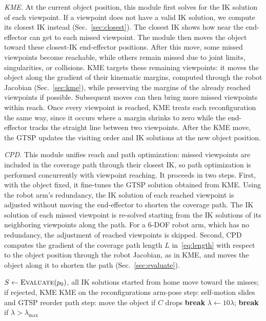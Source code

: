\documentclass[letterpaper, journal, twoside]{IEEEtran}
\begin{document}
\emph{KME.} At the current object position, this module first solves for the IK solution of each viewpoint. If a viewpoint does not have a valid IK solution, we compute its closest IK instead (Sec.~\ref{sec:closest}). The closest IK shows how near the end-effector can get to each missed viewpoint. The module then moves the object toward these closest-IK end-effector positions. After this move, some missed viewpoints become reachable, while others remain missed due to joint limits, singularities, or collisions. KME targets these remaining viewpoints: it moves the object along the gradient of their kinematic margins, computed through the robot Jacobian (Sec.~\ref{sec:kme}), while preserving the margins of the already reached viewpoints if possible. Subsequent moves can then bring more missed viewpoints within reach. Once every viewpoint is reached, KME treats each reconfiguration the same way, since it occurs where a margin shrinks to zero while the end-effector tracks the straight line between two viewpoints. After the KME move, the GTSP updates the visiting order and IK solutions at the new object position.

\emph{CPD.} This module unifies reach and path optimization: missed viewpoints are included in the coverage path through their closest IK, so path optimization is performed concurrently with viewpoint reaching. It proceeds in two steps. First, with the object fixed, it fine-tunes the GTSP solution obtained from KME. Using the robot arm's redundancy, the IK solution of each reached viewpoint is adjusted without moving the end-effector to shorten the coverage path. The IK solution of each missed viewpoint is re-solved starting from the IK solutions of its neighboring viewpoints along the path. For a 6-DOF robot arm, which has no redundancy, the adjustment of reached viewpoints is skipped. Second, CPD computes the gradient of the coverage path length $L$ in~\eqref{eq:length} with respect to the object position through the robot Jacobian, as in KME, and moves the object along it to shorten the path (Sec.~\ref{sec:evaluate}).

\begin{algorithm}[t]
\caption{Object placement and tour co-optimization}
\label{alg:descent}
\begin{algorithmic}[1]
\State $S \gets \textsc{Evaluate}(p_0)$, all IK solutions started from home
    \State move toward the misses; if rejected, KME
    \State KME on the reconfigurations
  \EndIf
  \State arm-pose step: self-motion slides and GTSP reorder
  \State path step: move the object if $C$ drops
     \textbf{break} \EndIf
    \State $\lambda \gets 10\lambda$; \textbf{break} if $\lambda > \lambda_{\max}$
  \EndIf
\EndWhile
\end{algorithmic}
\end{algorithm}
\end{document}
